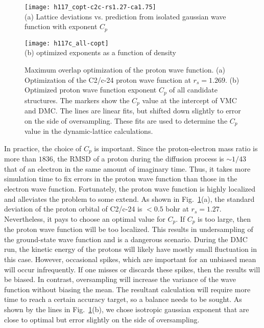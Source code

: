 \begin{figure}[h]
\centering
\begin{minipage}{0.49\textwidth}
\centering
\texttt{[image: h117\_copt-c2c-rs1.27-ca1.75]}\\
(a) Lattice deviations vs. prediction from isolated gaussian wave function with exponent $C_p$
\end{minipage}
\begin{minipage}{0.49\textwidth}
\centering
\texttt{[image: h117c\_all-copt]}\\
(b) optimized exponents as a function of density
\end{minipage}
\caption{Maximum overlap optimization of the proton wave function. (a) Optimization of the C2/c-24 proton wave function at $r_s=1.269$. (b) Optimized proton wave function exponent $C_p$ of all candidate structures. The markers show the $C_p$ value at the intercept of VMC and DMC. The lines are linear fits, but shifted down slightly to error on the side of oversampling. These fits are used to determine the $C_p$ value in the dynamic-lattice calculations.}
\label{fig:hsolid-cp-opt}
\end{figure}

In practice, the choice of $C_p$ is important.
Since the proton-electron mass ratio is more than $1836$, the RMSD of a proton during the diffusion process is $\sim 1/43$ that of an electron in the same amount of imaginary time.
Thus, it takes more simulation time to fix errors in the proton wave function than those in the electron wave function.
Fortunately, the proton wave function is highly localized and alleviates the problem to some extend.
As shown in Fig.~\ref{fig:hsolid-cp-opt}(a), the standard deviation of the proton orbital of C2/c-24 is $<0.5$ bohr at $r_s=1.27$.
Nevertheless, it pays to choose an optimal value for $C_p$.
If $C_p$ is too large, then the proton wave function will be too localized.
This results in undersampling of the ground-state wave function and is a dangerous scenario.
During the DMC run, the kinetic energy of the protons will likely have mostly small fluctuation in this case.
However, occasional spikes, which are important for an unbiased mean will occur infrequently.
If one misses or discards these spikes, then the results will be biased.
In contrast, oversampling will increase the variance of the wave function without biasing the mean.
The resultant calculation will require more time to reach a certain accuracy target, so a balance needs to be sought.
As shown by the lines in Fig.~\ref{fig:hsolid-cp-opt}(b), we chose isotropic gaussian exponent that are close to optimal but error slightly on the side of oversampling.

